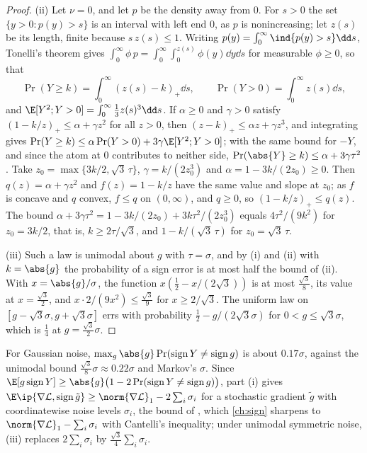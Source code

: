 \begin{refsection}
\begin{proof}
(ii) Let $\nu=0$, and let $p$ be the density away from $0$. For $s>0$ the set $\{y>0:p(y)>s\}$ is an interval with left end $0$, as $p$ is nonincreasing; let $z(s)$ be its length, finite because $s\,z(s)\le1$. Writing $p(y)=\int_0^\infty\ind\{p(y)>s\}\dd s$, Tonelli's theorem gives $\int_0^\infty\phi\,p=\int_0^\infty\int_0^{z(s)}\phi(y)\dd y\dd s$ for measurable $\phi\ge0$, so that
\[
  \Pr(Y\ge k)=\int_0^\infty(z(s)-k)_+\dd s,\qquad\Pr(Y>0)=\int_0^\infty z(s)\dd s,
\]
and $\E[Y^2;Y>0]=\int_0^\infty\frac13z(s)^3\dd s$.
If $\alpha\ge0$ and $\gamma>0$ satisfy $(1-k/z)_+\le\alpha+\gamma z^2$ for all $z>0$, then $(z-k)_+\le\alpha z+\gamma z^3$, and integrating gives $\Pr(Y\ge k)\le\alpha\Pr(Y>0)+3\gamma\E[Y^2;Y>0]$; with the same bound for $-Y$, and since the atom at $0$ contributes to neither side, $\Pr(\abs{Y}\ge k)\le\alpha+3\gamma\tau^2$. Take $z_0=\max\{3k/2,\sqrt3\,\tau\}$, $\gamma=k/(2z_0^3)$ and $\alpha=1-3k/(2z_0)\ge0$. Then $q(z)=\alpha+\gamma z^2$ and $f(z)=1-k/z$ have the same value and slope at $z_0$; as $f$ is concave and $q$ convex, $f\le q$ on $(0,\infty)$, and $q\ge0$, so $(1-k/z)_+\le q(z)$. The bound $\alpha+3\gamma\tau^2=1-3k/(2z_0)+3k\tau^2/(2z_0^3)$ equals $4\tau^2/(9k^2)$ for $z_0=3k/2$, that is, $k\ge2\tau/\sqrt3$, and $1-k/(\sqrt3\,\tau)$ for $z_0=\sqrt3\,\tau$.

(iii) Such a law is unimodal about $g$ with $\tau=\sigma$, and by (i) and (ii) with $k=\abs{g}$ the probability of a sign error is at most half the bound of (ii). With $x=\abs{g}/\sigma$, the function $x(\frac12-x/(2\sqrt3))$ is at most $\frac{\sqrt3}8$, its value at $x=\frac{\sqrt3}2$, and $x\cdot2/(9x^2)\le\frac{\sqrt3}9$ for $x\ge2/\sqrt3$. The uniform law on $[g-\sqrt3\sigma,g+\sqrt3\sigma]$ errs with probability $\frac12-g/(2\sqrt3\sigma)$ for $0<g\le\sqrt3\sigma$, which is $\frac14$ at $g=\frac{\sqrt3}2\sigma$.
\end{proof}

For Gaussian noise, $\max_g\abs{g}\Pr(\sign Y\ne\sign g)$ is about $0.17\sigma$, against the unimodal bound $\frac{\sqrt3}8\sigma\approx0.22\sigma$ and Markov's $\sigma$. Since $\E[g\sign Y]\ge\abs{g}\bigl(1-2\Pr(\sign Y\ne\sign g)\bigr)$, part (i) gives $\E\ip{\nabla\Loss,\sign\tilde g}\ge\norm{\nabla\Loss}_1-2\sum_i\sigma_i$ for a stochastic gradient $\tilde g$ with coordinatewise noise levels $\sigma_i$, the bound of \textcite{BernsteinEtAl2018}, which \cref{ch:sign} sharpens to $\norm{\nabla\Loss}_1-\sum_i\sigma_i$ with Cantelli's inequality; under unimodal symmetric noise, (iii) replaces $2\sum_i\sigma_i$ by $\frac{\sqrt3}4\sum_i\sigma_i$.


\end{refsection}
